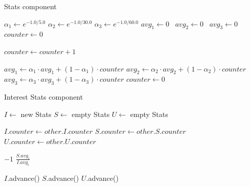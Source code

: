 \begin{algorithm}[h]
\caption{Stats component}
\label{algo:loadstats}
\begin{algorithmic}[1]
\State $\alpha_1 \leftarrow e^{-1.0/5.0}$  
\State $\alpha_2 \leftarrow e^{-1.0/30.0}$ 
\State $\alpha_3 \leftarrow e^{-1.0/60.0}$ 
\State $avg_1 \leftarrow 0$ \, $avg_2 \leftarrow 0$ \, $avg_3 \leftarrow 0$ \, $counter \leftarrow 0$

\vspace{0.2cm}
\State $counter \leftarrow counter + 1$
\EndFunction

\vspace{0.2cm}
 
\State {} 
\State $avg_1 \leftarrow \alpha_1 \cdot avg_1 + (1 - \alpha_1) \cdot counter$ 
\State $avg_2 \leftarrow \alpha_2 \cdot avg_2 + (1 - \alpha_2) \cdot counter$
\State $avg_3 \leftarrow \alpha_3 \cdot avg_3 + (1 - \alpha_3) \cdot counter$
\State $counter \leftarrow 0$
\EndFunction
\end{algorithmic}
\end{algorithm}


\begin{algorithm}[h]
\caption{Interest Stats component}
\label{algo:interest stats}
\begin{algorithmic}[1]
\State $I \leftarrow$ new Stats   
\State $S \leftarrow$ empty Stats 
\State $U \leftarrow$ empty Stats 


\vspace{0.2cm}
\State $I.counter \leftarrow other.I.counter $ 
\State $S.counter \leftarrow other.S.counter $
\State $U.counter \leftarrow other.U.counter $
\EndFunction

\vspace{0.2cm}
        \State \Return $-1$ 
     \Else
        \State \Return $\frac{S.avg_i}{I.avg_i}$ 
     \EndIf
  \EndFor
\EndFunction

\vspace{0.2cm}
 
\State $I.$advance()
\State $S.$advance()
\State $U.$advance()
\EndFunction

\end{algorithmic}
\end{algorithm}

